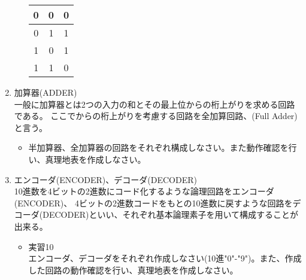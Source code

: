 \documentclass[dvipdfmx]{jsarticle}
\begin{document}
\begin{enumerate}
\begin{itemize}
\begin{table}[H]
\begin{tabular}{|c|c|c|}
											0 & 0 & 0\\ \hline
											0 & 1 & 1\\ \hline
											1 & 0 & 1\\ \hline
											1 & 1 & 0\\ \hline
										\end{tabular}
									\end{table}
							\end{itemize}
						\item 加算器(ADDER) \\
							一般に加算器とは2つの入力の和とその最上位からの桁上がりを求める回路である。
							ここでからの桁上がりを考慮する回路を全加算回路、(Full Adder)と言う。
							\begin{itemize}
								\item 半加算器、全加算器の回路をそれぞれ構成しなさい。また動作確認を行い、真理地表を作成しなさい。
							\end{itemize}
						\item エンコーダ(ENCODER)、デコーダ(DECODER) \\
							10進数を4ビットの2進数にコード化するような論理回路をエンコーダ(ENCODER)、
							4ビットの2進数コードをもとの10進数に戻すような回路をデコーダ(DECODER)といい、それぞれ基本論理素子を用いて構成することが出来る。
							\begin{itemize}
								\item 実習10 \\
									エンコーダ、デコーダをそれぞれ作成しなさい(10進"0"-"9")。また、作成した回路の動作確認を行い、真理地表を作成しなさい。
							\end{itemize}
					\end{enumerate}
\end{document}

